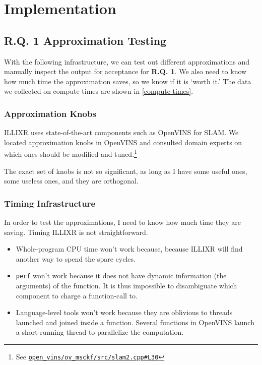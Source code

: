 \newcommand{\ILLIXRlink}[1]{See \href{https://github.com/ILLIXR/ILLIXR/tree/6c25003f79ecc35b4e002615b5a05d3077851d90/#1}{\texttt{ILLIXR/#1}}}
\newcommand{\OVlink}[1]{See \href{https://github.com/ILLIXR/open_vins/tree/edf1e24ef6557b54f4f66b4a47c67bb681a5fa10/#1}{\texttt{open\_vins/#1}}}

\section{Implementation}


\subsection{R.Q. 1 Approximation Testing}

With the following infrastructure, we can test out different approximations and manually inspect the output for acceptance for \textbf{R.Q. 1}.
We also need to know how much time the approximation saves, so we know if it is `worth it.'
The data we collected on compute-times are shown in \cref{compute-times}.

\subsubsection{Approximation Knobs}

ILLIXR uses state-of-the-art components such as OpenVINS \cite{Geneva2020ICRA} for SLAM.
We located approximation knobs in OpenVINS and consulted domain experts on which ones should be modified and tuned.\footnote{\OVlink{ov\_msckf/src/slam2.cpp\#L30}}

The exact set of knobs is not so significant, as long as I have some useful ones, some useless ones, and they are orthogonal.

\subsubsection{Timing Infrastructure}

In order to test the approximations, I need to know how much time they are saving. Timing ILLIXR is not straightforward.
\begin{itemize}
\item Whole-program CPU time won't work because, because ILLIXR will find another way to spend the spare cycles.
\item \verb+perf+ won't work because it does not have dynamic information (the arguments) of the function. It is thus impossible to disambiguate which component to charge a function-call to.
\item Language-level tools won't work because they are oblivious to threads launched and joined inside a function. Several functions in OpenVINS launch a short-running thread to parallelize the computation.
\end{itemize}

